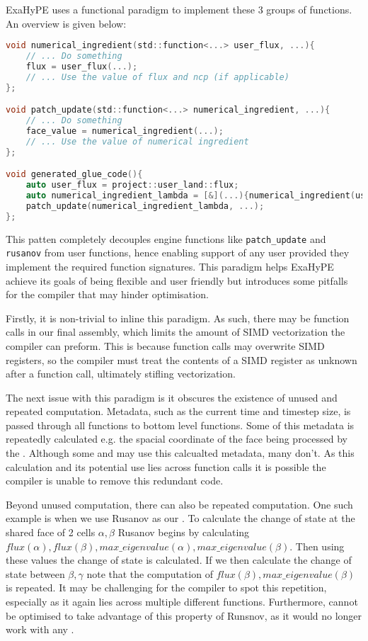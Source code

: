 ExaHyPE uses a functional paradigm to implement these 3 groups of functions.
An overview is given below:
\begin{lstlisting}[language=c]
void numerical_ingredient(std::function<...> user_flux, ...){
    // ... Do something
    flux = user_flux(...);
    // ... Use the value of flux and ncp (if applicable) 
};

void patch_update(std::function<...> numerical_ingredient, ...){
    // ... Do something
    face_value = numerical_ingredient(...);
    // ... Use the value of numerical ingredient
};

void generated_glue_code(){
    auto user_flux = project::user_land::flux;
    auto numerical_ingredient_lambda = [&](...){numerical_ingredient(user_flux, ...)};
    patch_update(numerical_ingredient_lambda, ...);
};
\end{lstlisting}
This patten completely decouples engine functions like \texttt{patch\_update} and \texttt{rusanov} from user functions, hence enabling support of any user  provided they implement the required function signatures.
This paradigm helps ExaHyPE achieve its goals of being flexible and user friendly but introduces some pitfalls for the compiler that may hinder optimisation.

Firstly, it is non-trivial to inline this paradigm.
As such, there may be function calls in our final assembly, which limits the amount of SIMD vectorization the compiler can preform.
This is because function calls may overwrite SIMD registers, so the compiler must treat the contents of a SIMD register as unknown after a function call, ultimately stifling vectorization.

The next issue with this paradigm is it obscures the existence of unused and repeated computation.
Metadata, such as the current time and timestep size, is passed through all functions to bottom level  functions.
Some of this metadata is repeatedly calculated e.g. the spacial coordinate of the face being processed by the .
Although some  and  may use this calcualted metadata, many don't.
As this calculation and its potential use lies across function calls it is possible the compiler is unable to remove this redundant code.

Beyond unused computation, there can also be repeated computation.
One such example is when we use Rusanov as our .
To calculate the change of state at the shared face of 2 cells $\alpha,\beta$ Rusanov begins by calculating $flux(\alpha), flux(\beta), max\_eigenvalue(\alpha), max\_eigenvalue(\beta)$.
Then using these values the change of state is calculated.
If we then calculate the change of state between $\beta,\gamma$ note that the computation of $flux(\beta), max\_eigenvalue(\beta)$ is repeated.
It may be challenging for the compiler to spot this repetition, especially as it again lies across multiple different functions.
Furthermore,  cannot be optimised to take advantage of this property of Runsnov, as it would no longer work with any .


